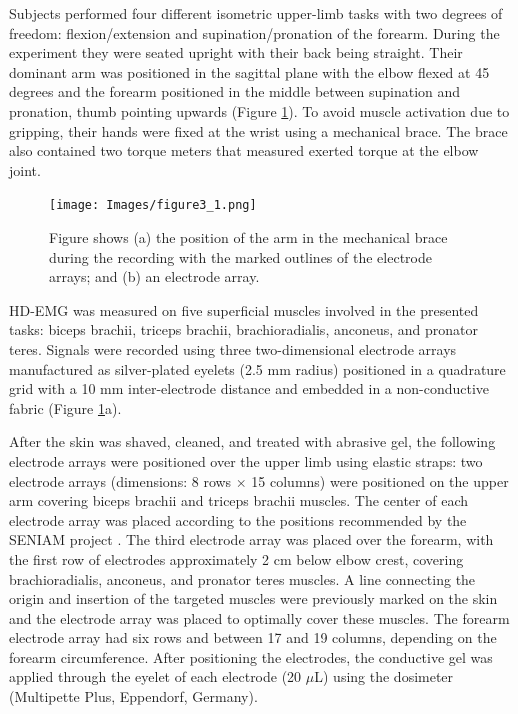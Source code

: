 Subjects performed four different isometric upper-limb tasks with two degrees of freedom: flexion/extension and supination/pronation of the forearm. During the experiment they were seated upright with their back being straight. Their dominant arm was positioned in the sagittal plane with the elbow flexed at 45 degrees and the forearm positioned in the middle between supination and pronation, thumb pointing upwards (Figure \ref{fig:3-1}). To avoid muscle activation due to gripping, their hands were fixed at the wrist using a mechanical brace. The brace also contained two torque meters that measured exerted torque at the elbow joint.

\begin{figure}[ht]
\centering
\texttt{[image: Images/figure3\_1.png]}
\caption{Figure shows (a) the position of the arm in the mechanical brace during the recording with the marked outlines of the electrode arrays; and (b) an electrode array.}
\label{fig:3-1}
\end{figure}      

HD-EMG was measured on five superficial muscles involved in the presented tasks: biceps brachii, triceps brachii, brachioradialis, anconeus, and pronator teres. Signals were recorded using three two-dimensional electrode arrays manufactured as silver-plated eyelets (2.5 mm radius) positioned in a quadrature grid with a 10 mm inter-electrode distance and embedded in a non-conductive fabric (Figure \ref{fig:3-1}a).

After the skin was shaved, cleaned, and treated with abrasive gel, the following electrode arrays were positioned over the upper limb using elastic straps: two electrode arrays (dimensions: 8 rows $\times$ 15 columns) were positioned on the upper arm covering biceps brachii and triceps brachii muscles. The center of each electrode array was placed according to the positions recommended by the SENIAM project \citep{Hermens1999}. The third electrode array was placed over the forearm, with the first row of electrodes approximately 2 cm below elbow crest, covering brachioradialis, anconeus, and pronator teres muscles. A line connecting the origin and insertion of the targeted muscles were previously marked on the skin and the electrode array was placed to optimally cover these muscles. The forearm electrode array had six rows and between 17 and 19 columns, depending on the forearm circumference. After positioning the electrodes, the conductive gel was applied through the eyelet of each electrode (20 $\mu$L) using the dosimeter (Multipette Plus, Eppendorf, Germany).

